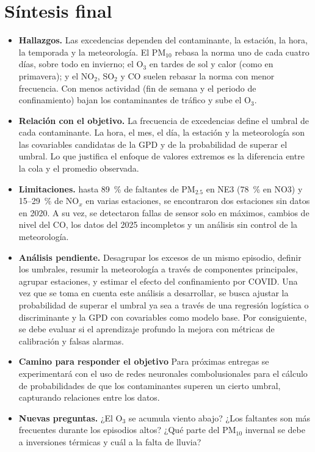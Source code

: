\documentclass[11pt]{article}
\begin{document}
\section{Síntesis final}
\begin{itemize}[leftmargin=*]
    \item\textbf{Hallazgos.} Las excedencias dependen del contaminante, la estación, la hora, la temporada y la meteorología. El PM$_{10}$ rebasa la norma uno de cada cuatro días, sobre todo en invierno; el O$_3$ en tardes de sol y calor (como en primavera); y el NO$_2$, SO$_2$ y CO suelen rebasar la norma con menor frecuencia. Con menos actividad (fin de semana y el periodo de confinamiento) bajan los contaminantes de tráfico y sube el O$_3$. 
    \item \textbf{Relación con el objetivo.} La frecuencia de excedencias define el umbral de cada contaminante. La hora, el mes, el día, la estación y la meteorología son las covariables candidatas de la GPD y de la probabilidad de superar el umbral. Lo que justifica el enfoque de valores extremos es la diferencia entre la cola y el promedio observada. 
    \item \textbf{Limitaciones.} hasta 89~\% de faltantes de PM$_{2.5}$ en NE3 (78~\% en NO3) y 15--29~\% de NO$_x$ en varias estaciones, se encontraron dos estaciones sin datos en 2020. A su vez, se detectaron fallas de sensor solo en máximos, cambios de nivel del CO, los datos del 2025 incompletos y un análisis sin control de la meteorología. 
    \item \textbf{Análisis pendiente.} Desagrupar los excesos de un mismo episodio, definir los umbrales, resumir la meteorología a través de componentes principales, agrupar estaciones, y estimar el efecto del confinamiento por COVID. Una vez que se toma en cuenta este análisis a desarrollar, se busca ajustar la probabilidad de superar el umbral ya sea a través de una regresión logística o discriminante y la GPD con covariables como modelo base. Por consiguiente, se debe evaluar si el aprendizaje profundo la mejora con métricas de calibración y falsas alarmas. 
    \item \textbf{Camino para responder el objetivo} Para próximas entregas se experimentará con el uso de redes neuronales combolusionales para el cálculo de probabilidades de que los contaminantes superen un cierto umbral, capturando relaciones entre los datos. 
    \item \textbf{Nuevas preguntas.} ¿El O$_3$ se acumula viento abajo? ¿Los faltantes son más frecuentes durante los episodios altos? ¿Qué parte del PM$_{10}$ invernal se debe a inversiones térmicas y cuál a la falta de lluvia?
\end{itemize}
 
\end{document}
